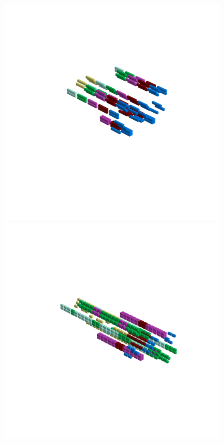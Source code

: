 \clearpage
\begin{figure}[H]
    \centering
      \vspace*{-3cm}
      \hspace*{-6cm}
      \includegraphics[width=15cm]{src/symmetries/pattern14_1-45.png}%
      \hspace*{-8cm}
      \includegraphics[width=15cm]{src/symmetries/pattern14_2-45.png}\\

\end{figure}
